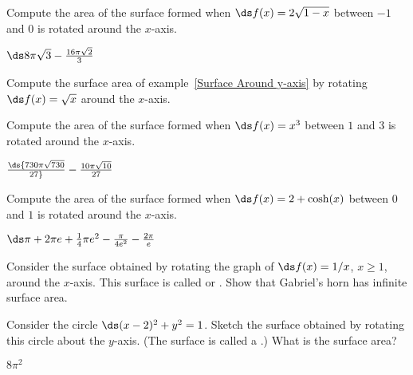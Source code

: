 \begin{enumialphparenastyle}

\begin{ex}
 Compute the area of the surface formed when $\ds f(x)=2\sqrt{1-x}$
between $-1$ and $0$ is rotated around the $x$-axis.
\begin{sol}
 $\ds 8\pi\sqrt3-{16\pi\sqrt2\over 3}$
\end{sol}
\end{ex}

\begin{ex}
 Compute the surface area of example~\ref{Surface Around y-axis} by rotating $\ds f(x)=\sqrt x$ around the $x$-axis.
\end{ex}

\begin{ex}
 Compute the area of the surface formed when 
$\ds f(x)=x^3$ between $1$ and $3$ is rotated around the $x$-axis.
\begin{sol}
 $\ds {730\pi\sqrt{730}\over27}-{10\pi\sqrt{10}\over 27}$
\end{sol}
\end{ex}

\begin{ex}
 Compute the area of the surface formed when 
$\ds f(x)=2 +\cosh (x)$ between $0$ and $1$ is rotated around the
  $x$-axis.
\begin{sol}
 $\ds \pi +2\pi e+ {1\over4}\pi e^2-{\pi\over4e^2}-{2\pi\over e}$
\end{sol}
\end{ex}

\begin{ex}
 Consider the surface obtained by rotating the graph of $\ds
f(x)=1/x$, $x\geq 1$, around the $x$-axis. This surface is called
 or .  
Show that Gabriel's horn has
infinite surface area.
\end{ex}

\begin{ex}
 Consider the circle $\ds (x-2)^2+y^2 = 1$. Sketch the
surface obtained by rotating this circle about the $y$-axis. (The
surface is called a .) What is the surface area?
\begin{sol}
 $8\pi^2$
\end{sol}
\end{ex}


\end{enumialphparenastyle}
